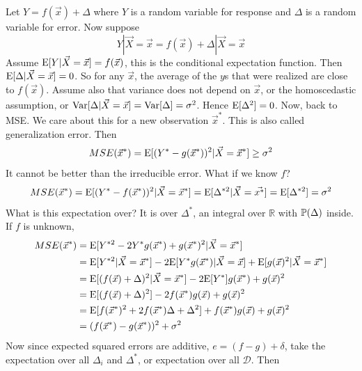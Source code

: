 \documentclass[12pt]{article}
\begin{document}
Let $Y = f(\vec{x}) + \Delta$ where $Y$ is a random variable for response and $\Delta$ is a random variable for error. Now suppose $$ Y | \vec{X} = \vec{x} = f(\vec{x}) + \Delta | \vec{X} = \vec{x} $$ Assume $\mathrm{E}[ Y | \vec{X} = \vec{x} ] = f(\vec{x})$, this is the conditional expectation function. Then $\mathrm{E}[ \Delta |\vec{X} = \vec{x} ]=0$. So for any $\vec{x}$, the average of the $y$s that were realized are close to $f(\vec{x})$. Assume also that variance does not depend on $\vec{x}$, or the homoscedastic assumption, or $\mathrm{Var}[ \Delta | \vec{X} = \vec{x} ] = \mathrm{Var}[ \Delta ] = \sigma^2$. Hence $\mathrm{E}[ \Delta^2 ] = 0$. Now, back to MSE. We care about this for a new observation $\vec{x}^*$. This is also called generalization error. Then $$ MSE(\vec{x}^*) = \mathrm{E}[ (Y^* - g(\vec{x}^*))^2 | \vec{X} = \vec{x}^* ] \geq \sigma^2 $$ It cannot be better than the irreducible error. What if we know $f$? $$ MSE(\vec{x}^*) = \mathrm{E}[ (Y^* - f(\vec{x}^*))^2 | \vec{X} = \vec{x}^* ] = \mathrm{E}[ \Delta^{*2} | \vec{X} = \vec{x^*} ] = \mathrm{E}[ \Delta^{*2} ] = \sigma^2 $$ What is this expectation over? It is over $\Delta^*$, an integral over $\mathbb{R}$ with $\mathbb{P}(\Delta)$ inside. \\
If $f$ is unknown, $$ \begin{aligned} MSE(\vec{x}^*) & = \mathrm{E}[ Y^{*2} - 2Y^*g(\vec{x}^*) + g(\vec{x}^*)^2 | \vec{X} = \vec{x}^* ] \\ &= \mathrm{E}[ Y^{*2} | \vec{X} = \vec{x}^* ] - 2\mathrm{E}[ Y^*g(\vec{x}^*) | \vec{X} = \vec{x} ] + \mathrm{E}[ g(\vec{x})^2 | \vec{X} = \vec{x}^* ] \\ &= \mathrm{E}[ (f(\vec{x}) + \Delta)^2 | \vec{X} = \vec{x}^* ] - 2\mathrm{E}[ Y^* ]g(\vec{x}^*) + g(\vec{x})^2 \\ &= \mathrm{E}[ (f(\vec{x}) + \Delta)^2 ] - 2f(\vec{x}^*)g(\vec{x}) + g(\vec{x})^2 \\ &= \mathrm{E}[ f(\vec{x}^*)^2 + 2f(\vec{x}^*)\Delta + \Delta^2 ] + f(\vec{x}^*)g(\vec{x}) + g(\vec{x})^2 \\ &= (f(\vec{x}^*) - g(\vec{x}^*))^2 + \sigma^2 \end{aligned} $$ 
Now since expected squared errors are additive, $e = (f-g)+\delta$, take the expectation over all $\Delta_i$ and $\Delta^*$, or expectation over all $\mathcal{D}$. Then 
\end{document}
